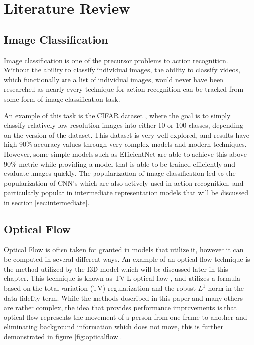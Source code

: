 
\chapter{Literature Review} %

\label{LiteratureReview} %

\section{Image Classification}

Image classification is one of the precursor problems to action recognition. Without the ability to classify individual images, the ability to classify videos, which functionally are a list of individual images, would never have been researched as nearly every technique for action recognition can be tracked from some form of image classification task.

An example of this task is the CIFAR dataset \cite{cifar}, where the goal is to simply classify relatively low resolution images into either 10 or 100 classes, depending on the version of the dataset. This dataset is very well explored, and results have high 90\% accuracy values through very complex models and modern techniques. However, some simple models such as EfficientNet \cite{efficientnet} are able to achieve this above 90\% metric while providing a model that is able to be trained efficiently and evaluate images quickly. The popularization of image classification led to the popularization of CNN's which are also actively used in action recognition, and particularly popular in intermediate representation models that will be discussed in section \ref{sec:intermediate}.

\section{Optical Flow}

Optical Flow is often taken for granted in models that utilize it, however it can be computed in several different ways. An example of an optical flow technique is the method utilized by the I3D model \cite{i3d} which will be discussed later in this chapter. This technique is known as TV-L optical flow \cite{TV-L}, and utilizes a formula based on the total variation (TV) regularization and the robust $L^1$ norm in the data fidelity term. While the methods described in this paper and many others are rather complex, the idea that provides performance improvements is that optical flow represents the movement of a person from one frame to another and eliminating background information which does not move, this is further demonstrated in figure \ref{fig:opticalflow}.


